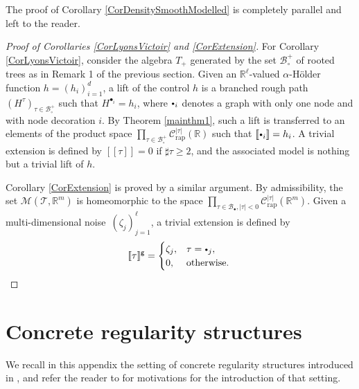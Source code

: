 \documentclass[11pt]{article}
\numberwithin{equation}{section}
\newcommand{\sbullet}{{\scriptscriptstyle\bullet}}
\newcommand{\scbullet}{{\raisebox{1pt}{$\sbullet$}}}
\theoremstyle{plain}
\theoremstyle{definition}
\newcommand{\Brac}[1]{[\![#1]\!]}
\newcommand{\rap}{\mathrm{rap}}
\newcommand{\sfg}{\mathsf{g}}
\newcommand{\scrM}{\mathscr{M}}
\newcommand{\scrT}{\mathscr{T}}
\newcommand{\bbR}{\mathbb{R}}
\newcommand{\mcB}{\mathcal{B}}
\newcommand{\mcC}{\mathcal{C}}
\begin{document}
The proof of Corollary \ref{CorDensitySmoothModelled} is completely parallel and left to the reader.

\begin{proof}[Proof of Corollaries \ref{CorLyonsVictoir} and \ref{CorExtension}]
For Corollary \ref{CorLyonsVictoir}, consider the algebra $T_+$ generated by the set $\mcB_\circ^+$ of rooted trees as in Remark 1 of the previous section. Given an $\bbR^\ell$\nobreakdash-valued $\alpha$-Hölder function $h=(h_i)_{i=1}^d$, a lift of the control $h$ is a branched rough path $(H^\tau)_{\tau\in\mcB_\circ^+}$ such that $H^{\sbullet_i}=h_i$, where $\scbullet_i$ denotes a graph with only one node and with node decoration $i$. By Theorem \ref{mainthm1}, such a lift is transferred to an elements of the product space $\prod_{\tau\in\mcB_\circ^+} \mcC_\rap^{|\tau|}(\bbR)$ such that $\Brac{\scbullet_i}=h_i$. A trivial extension is defined by $\Brac{\tau}=0$ if $\sharp\tau\ge2$, and the associated model is nothing but a trivial lift of $h$.

Corollary \ref{CorExtension} is proved by a similar argument. By admissibility, the set $\scrM(\scrT,\bbR^m)$ is homeomorphic to the space $\prod_{\tau\in\mcB_\sbullet, |\tau|<0} \mcC_\rap^{|\tau|}(\bbR^m)$.
Given a multi-dimensional noise~$(\zeta_j)_{j=1}^\ell$, a trivial extension is defined by\vspace*{-3pt}
\[
\Brac{\tau}^{\sfg}=
\begin{cases}
\zeta_j, & \tau=\scbullet_j,\\
0, & \text{otherwise}.
\end{cases} \qedhere
\]
\end{proof}

\appendix
\section{Concrete regularity structures}
\label{SectionAppendixConcreteRS}

We recall in this appendix the setting of concrete regularity structures introduced in \cite{BH}, and refer the reader to \cite[\S2]{BH} for motivations for the introduction of that setting.
\end{document}

